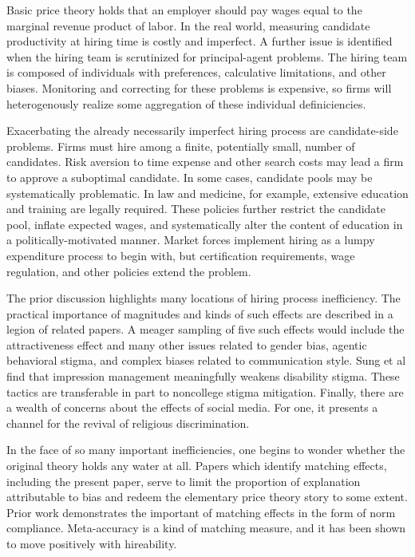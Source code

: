 \documentclass[review]{elsarticle}
\begin{document}
Basic price theory holds that an employer should pay wages equal to the marginal revenue product of labor.
In the real world, measuring candidate productivity at hiring time is costly and imperfect.
A further issue is identified when the hiring team is scrutinized for principal-agent problems.
The hiring team is composed of individuals with preferences, calculative limitations, and other biases.
Monitoring and correcting for these problems is expensive,
so firms will heterogenously realize some aggregation of these individual definiciencies.

Exacerbating the already necessarily imperfect hiring process are candidate-side problems.
Firms must hire among a finite, potentially small, number of candidates.
Risk aversion to time expense and other search costs may lead a firm to approve a suboptimal candidate\cite{simon1976substantive}.
In some cases, candidate pools may be systematically problematic.
In law and medicine, for example, extensive education and training are legally required.
These policies further restrict the candidate pool, inflate expected wages, and systematically alter the content of education in a politically-motivated manner.
Market forces implement hiring as a lumpy expenditure process to begin with, but certification requirements, wage regulation, and other policies extend the problem.

The prior discussion highlights many locations of hiring process inefficiency.
The practical importance of magnitudes and kinds of such effects are described in a legion of related papers.
A meager sampling of five such effects would include the attractiveness effect and many other issues related to gender bias\cite{quereshi1986physical},
agentic behavioral stigma\cite{steffens2009feminization},
and complex biases related to communication style\cite{brouer2017gender, nijs2019effects, sampugnaro1983nonverbal}.
Sung et al find that impression management meaningfully weakens disability stigma\cite{sung2017disclose}.
These tactics are transferable in part to noncollege stigma mitigation.
Finally, there are a wealth of concerns about the effects of social media.
For one, it presents a channel for the revival of religious discrimination\cite{esposito2018signaling}.

In the face of so many important inefficiencies, one begins to wonder whether the original theory holds any water at all.
Papers which identify matching effects, including the present paper,
serve to limit the proportion of explanation attributable to bias and redeem the elementary price theory story to some extent.
Prior work demonstrates the important of matching effects in the form of norm compliance\cite{francesco1981gender}.
Meta-accuracy is a kind of matching measure, and it has been shown to move positively with hireability\cite{renier2018no}.
\end{document}
